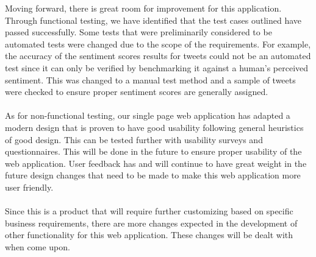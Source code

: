 \documentclass[12pt]{article}
\begin{document}
Moving forward, there is great room for improvement for this application. Through functional testing, we have identified that the test cases outlined have passed successfully. Some tests that were preliminarily considered to be automated tests were changed due to the scope of the requirements. For example, the accuracy of the sentiment scores results for tweets could not be an automated test since it can only be verified by benchmarking it against a human's perceived sentiment. This was changed to a manual test method and a sample of tweets were checked to ensure proper sentiment scores are generally assigned.
\\ \\
As for non-functional testing, our single page web application has adapted a modern design that is proven to have good usability following general heuristics of good design. This can be tested further with usability surveys and questionnaires. This will be done in the future to ensure proper usability of the web application. User feedback has and will continue to have great weight in the future design changes that need to be made to make this web application more user friendly.
\\ \\
Since this is a product that will require further customizing based on specific business requirements, there are more changes expected in the development of other functionality for this web application. These changes will be dealt with when come upon.
\end{document}
